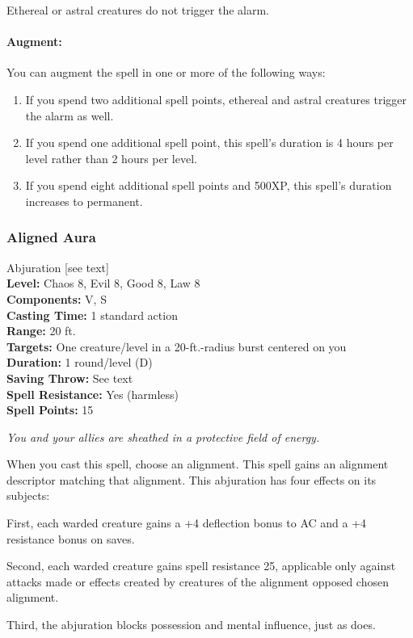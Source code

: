 Ethereal or astral creatures do not trigger the alarm.

\paragraph{Augment:} You can augment the spell in one or more of the following ways:
\begin{enumerate}
\item If you spend two additional spell points, ethereal and astral creatures trigger the alarm as well.
\item If you spend one additional spell point, this spell's duration is 4 hours per level rather than 2 hours per level.
\item If you spend eight additional spell points and 500XP, this spell's duration increases to permanent.
\end{enumerate}
\subsubsection{Aligned Aura}
\label{Spell:AlignedAura}
Abjuration [see text]
\\ \textbf{Level:} Chaos 8, Evil 8, Good 8, Law 8
\\ \textbf{Components:} V, S
\\ \textbf{Casting Time:} 1 standard action
\\ \textbf{Range:} 20 ft.
\\ \textbf{Targets:} One creature/level in a 20-ft.-radius burst centered on you
\\ \textbf{Duration:} 1 round/level (D)
\\ \textbf{Saving Throw:} See text
\\ \textbf{Spell Resistance:} Yes (harmless)
\\ \textbf{Spell Points:} 15

\emph{You and your allies are sheathed in a protective field of energy.}

When you cast this spell, choose an alignment. This spell gains an alignment descriptor matching that alignment.
This abjuration has four effects on its subjects:

First, each warded creature gains a +4 deflection bonus to AC and a +4 resistance bonus on saves. 

Second, each warded creature gains spell resistance 25, applicable only against attacks made or effects created by creatures of the alignment opposed chosen alignment.

Third, the abjuration blocks possession and mental influence, just as  does.

